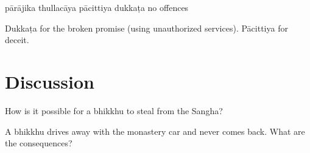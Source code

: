 \begin{exam}{\autoExamName}
\begin{problem*}
\begin{parts}
  \bigskip

  \begin{answers}{5}
    \bChoices
     pārājika\eAns
     thullacāya\eAns
     pācittiya\eAns
     dukkaṭa\eAns
     no offences\eAns
    \eChoices
  \end{answers}

  \begin{solution}
    Dukkaṭa for the broken promise (using unauthorized services). Pācittiya for deceit.
  \end{solution}

\end{parts}

\end{problem*}

\section*{Discussion}

How is it possible for a bhikkhu to steal from the Sangha?

\bigskip

A bhikkhu drives away with the monastery car and never comes back.
What are the consequences?

\end{exam}
